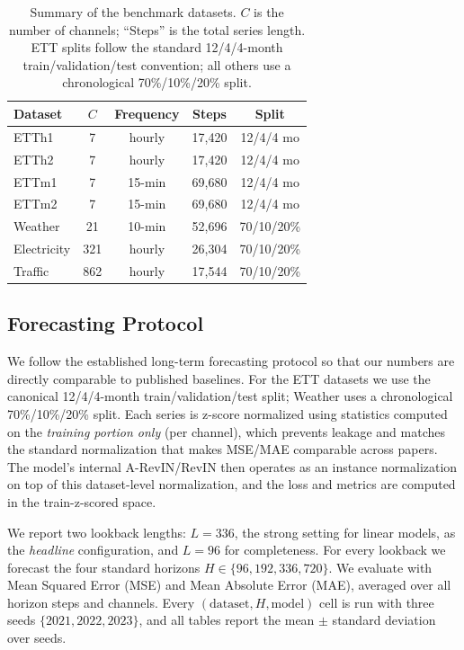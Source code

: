 \begin{table}[t]
\centering
\caption{Summary of the benchmark datasets. $C$ is the number of channels;
``Steps'' is the total series length. ETT splits follow the standard
12/4/4-month train/validation/test convention; all others use a chronological
70\%/10\%/20\% split.}
\label{tab:datasets}
\begin{tabular}{lcccc}
\toprule
Dataset     & $C$ & Frequency & Steps      & Split \\
\midrule
ETTh1       &  7  & hourly    & 17{,}420   & 12/4/4 mo \\
ETTh2       &  7  & hourly    & 17{,}420   & 12/4/4 mo \\
ETTm1       &  7  & 15-min    & 69{,}680   & 12/4/4 mo \\
ETTm2       &  7  & 15-min    & 69{,}680   & 12/4/4 mo \\
Weather     & 21  & 10-min    & 52{,}696   & 70/10/20\% \\
Electricity & 321 & hourly    & 26{,}304   & 70/10/20\% \\
Traffic     & 862 & hourly    & 17{,}544   & 70/10/20\% \\
\bottomrule
\end{tabular}
\end{table}

\subsection{Forecasting Protocol}
\label{sec:exp:protocol}

We follow the established long-term forecasting protocol
\citep{zeng2023dlinear,nie2023patchtst} so that our numbers are directly
comparable to published baselines. For the ETT datasets we use the canonical
12/4/4-month train/validation/test split; Weather uses a chronological
70\%/10\%/20\% split. Each series is z-score normalized using statistics
computed on the \emph{training portion only} (per channel), which prevents
leakage and matches the standard normalization that makes MSE/MAE comparable
across papers. The model's internal A-RevIN/RevIN then operates as an instance
normalization on top of this dataset-level normalization, and the loss and
metrics are computed in the train-z-scored space.

We report two lookback lengths: $L{=}336$, the strong setting for linear models,
as the \emph{headline} configuration, and $L{=}96$ for completeness. For every
lookback we forecast the four standard horizons $H \in \{96, 192, 336, 720\}$.
We evaluate with Mean Squared Error (MSE) and Mean Absolute Error (MAE),
averaged over all horizon steps and channels. Every $(\text{dataset}, H,
\text{model})$ cell is run with three seeds $\{2021, 2022, 2023\}$, and all
tables report the mean $\pm$ standard deviation over seeds.

